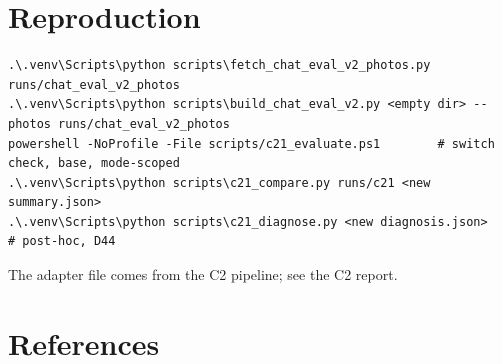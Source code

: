 \documentclass[11pt,a4paper]{article}
\begin{document}
\section{Reproduction}

\begin{Verbatim}[fontsize=\footnotesize]
.\.venv\Scripts\python scripts\fetch_chat_eval_v2_photos.py runs/chat_eval_v2_photos
.\.venv\Scripts\python scripts\build_chat_eval_v2.py <empty dir> --photos runs/chat_eval_v2_photos
powershell -NoProfile -File scripts/c21_evaluate.ps1        # switch check, base, mode-scoped
.\.venv\Scripts\python scripts\c21_compare.py runs/c21 <new summary.json>
.\.venv\Scripts\python scripts\c21_diagnose.py <new diagnosis.json>   # post-hoc, D44
\end{Verbatim}

The adapter file comes from the C2 pipeline; see the C2 report.

\section*{References}
\end{document}
